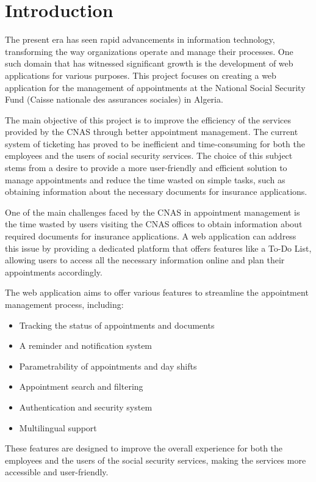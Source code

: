\section{Introduction}
The present era has seen rapid advancements in information technology, transforming the way organizations operate and manage their processes. One such domain that has witnessed significant growth is the development of web applications for various purposes. This project focuses on creating a web application for the management of appointments at the National Social Security Fund (Caisse nationale des assurances sociales) in Algeria.

The main objective of this project is to improve the efficiency of the services provided by the CNAS through better appointment management. The current system of ticketing has proved to be inefficient and time-consuming for both the employees and the users of social security services. The choice of this subject stems from a desire to provide a more user-friendly and efficient solution to manage appointments and reduce the time wasted on simple tasks, such as obtaining information about the necessary documents for insurance applications.

One of the main challenges faced by the CNAS in appointment management is the time wasted by users visiting the CNAS offices to obtain information about required documents for insurance applications. A web application can address this issue by providing a dedicated platform that offers features like a To-Do List, allowing users to access all the necessary information online and plan their appointments accordingly.

The web application aims to offer various features to streamline the appointment management process, including:
\begin{itemize}
    \item Tracking the status of appointments and documents
    \item A reminder and notification system
    \item Parametrability of appointments and day shifts
    \item Appointment search and filtering
    \item Authentication and security system
    \item Multilingual support
\end{itemize}

These features are designed to improve the overall experience for both the employees and the users of the social security services, making the services more accessible and user-friendly.

